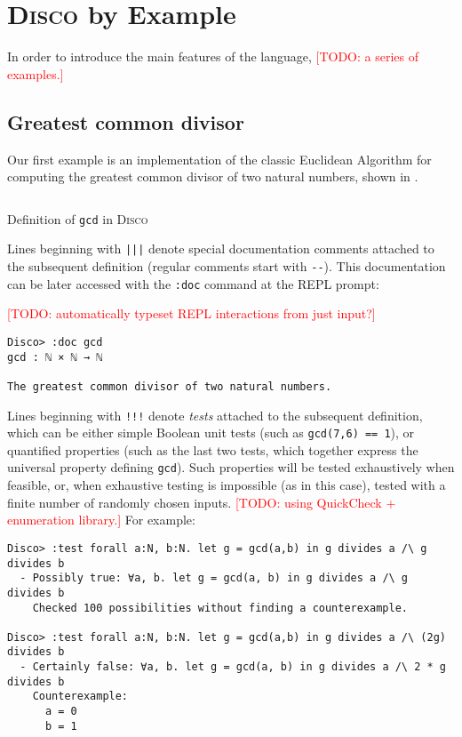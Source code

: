\documentclass[submission,copyright,creativecommons]{eptcs}
\newcommand{\disco}{\textsc{Disco}\xspace}
\newcommand{\pref}[1]{\prettyref{#1}}
\newcommand{\todo}[1]{\textcolor{red}{[TODO: #1]}}
\newcommand{\todo}[1]{}
\begin{document}
\section{\disco by Example}

In order to introduce the main features of the language, \todo{a series
of examples.}

\subsection{Greatest common divisor}
\label{sec:gcd}

Our first example is an implementation of the classic Euclidean
Algorithm for computing the greatest common divisor of two natural
numbers, shown in \pref{lst:gcd}.

\begin{listing}[!htp]
\inputminted{text}{examples/gcd.disco}
\caption{Definition of \texttt{gcd} in \disco}
\label{lst:gcd}
\end{listing}

Lines beginning with \texttt{|||} denote special documentation
comments attached to the subsequent definition (regular comments start with
\texttt{-{}-}).  This documentation can be later accessed with the
\texttt{:doc} command at the REPL prompt:

\todo{automatically typeset REPL interactions from just input?}
\begin{verbatim}
Disco> :doc gcd
gcd : ℕ × ℕ → ℕ

The greatest common divisor of two natural numbers.

\end{verbatim}

Lines beginning with \texttt{!!!} denote \emph{tests} attached to the
subsequent definition, which can be either simple Boolean unit tests
(such as \verb|gcd(7,6) == 1|), or quantified properties (such as the
last two tests, which together express the universal property defining
\verb|gcd|).  Such properties will be tested exhaustively when
feasible, or, when exhaustive testing is impossible (as in this case),
tested with a finite number of randomly chosen inputs. \todo{using
QuickCheck + enumeration library.}  For example:

\begin{verbatim}
Disco> :test forall a:N, b:N. let g = gcd(a,b) in g divides a /\ g divides b
  - Possibly true: ∀a, b. let g = gcd(a, b) in g divides a /\ g divides b
    Checked 100 possibilities without finding a counterexample.

Disco> :test forall a:N, b:N. let g = gcd(a,b) in g divides a /\ (2g) divides b
  - Certainly false: ∀a, b. let g = gcd(a, b) in g divides a /\ 2 * g divides b
    Counterexample:
      a = 0
      b = 1

\end{verbatim}
\end{document}
